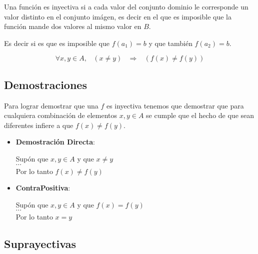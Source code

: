 \documentclass[12pt, fleqn]{report}                             %
\DeclareMathOperator \Space {\quad}                             %
\DeclareMathOperator \MiniSpace {\;}                            %
\newcommand \lequal {\MiniSpace \Leftrightarrow \MiniSpace}     %
\newcommand \linfire {\MiniSpace \Rightarrow \MiniSpace}        %
\begin{document}
                Una función es inyectiva si a cada valor del conjunto dominio le corresponde un valor
                distinto en el conjunto imágen, es decir en el que es imposible que la función mande
                dos valores al mismo valor en $B$.

                Es decir si es que es imposible que $f(a_1) = b$ y que también $f(a_2) = b$.

                \begin{equation}
                   \forall x, y \in A, \MiniSpace (x \neq y) \linfire (f(x) \neq f(y))
                \end{equation}


                \subsection*{Demostraciones}
                
                Para lograr demostrar que una $f$ es inyectiva tenemos que demostrar que para
                cualquiera combinación de elementos $x, y \in A$ se cumple que el hecho de que
                sean diferentes infiere a que $f(x) \neq f(y)$.

                \begin{itemize}
                    \item 
                        \textbf{Demostración Directa}:

                        Supón que $x, y \in A$ y que $x \neq y$
                        \\
                        $\cdots$
                        \\
                        Por lo tanto $f(x) \neq f(y)$

                    \item 
                        \textbf{ContraPositiva}:

                        Supón que $x, y \in A$ y que $f(x) = f(y)$
                        \\
                        $\cdots$
                        \\
                        Por lo tanto $x = y$

                \end{itemize}


            \clearpage
            \subsection{Suprayectivas}
\end{document}
